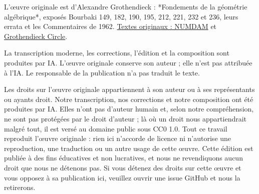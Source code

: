 \begingroup\small
L’œuvre originale est d’Alexandre Grothendieck : *Fondements de la géométrie algébrique*, exposés Bourbaki 149, 182, 190, 195, 212, 221, 232 et 236, leurs errata et les Commentaires de 1962. \href{https://www.numdam.org/}{Textes originaux : NUMDAM} et \href{https://webusers.imj-prg.fr/~leila.schneps/grothendieckcircle/FGA.pdf}{Grothendieck Circle}.

La transcription moderne, les corrections, l’édition et la composition sont produites par IA. L’œuvre originale conserve son auteur ; elle n’est pas attribuée à l’IA. Le responsable de la publication n’a pas traduit le texte.

Les droits sur l'œuvre originale appartiennent à son auteur ou à ses représentants ou ayants droit. Notre transcription, nos corrections et notre composition ont été produites par IA. Elles n'ont pas d'auteur humain et, selon notre compréhension, ne sont pas protégées par le droit d'auteur ; là où un droit nous appartiendrait malgré tout, il est versé au domaine public sous CC0 1.0. Tout ce travail reproduit l'œuvre originale : rien ici n'accorde de licence ni n'autorise une reproduction, une traduction ou un autre usage de cette œuvre. Cette édition est publiée à des fins éducatives et non lucratives, et nous ne revendiquons aucun droit que nous ne détenons pas. Si vous détenez des droits sur cette œuvre et vous opposez à sa publication ici, veuillez ouvrir une issue GitHub et nous la retirerons.

\par\endgroup\clearpage
